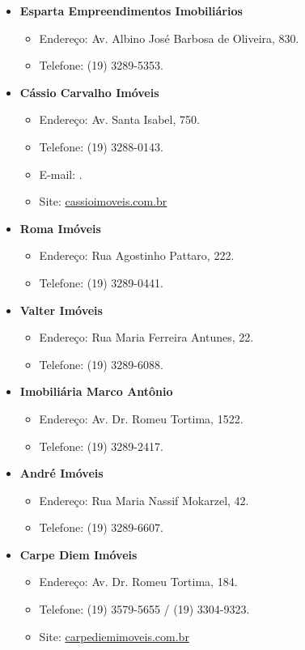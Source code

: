 \begin{itemize}
\item  \textbf{Esparta Empreendimentos Imobiliários}
\begin{itemize}
\item  Endereço: Av. Albino José Barbosa de Oliveira, 830.
\item  Telefone: (19) 3289-5353.
\end{itemize}

\item  \textbf{Cássio Carvalho Imóveis}
\begin{itemize}
\item  Endereço: Av. Santa Isabel, 750.
\item  Telefone: (19) 3288-0143.
\item  E-mail: .
\item  Site: \url{cassioimoveis.com.br}
\end{itemize}

\item  \textbf{Roma Imóveis}
\begin{itemize}
\item  Endereço: Rua Agostinho Pattaro, 222.
\item  Telefone: (19) 3289-0441.
\end{itemize}

\item  \textbf{Valter Imóveis}
\begin{itemize}
\item  Endereço: Rua Maria Ferreira Antunes, 22.
\item  Telefone: (19) 3289-6088.
\end{itemize}

\item  \textbf{Imobiliária Marco Antônio}
\begin{itemize}
\item  Endereço: Av. Dr. Romeu Tortima, 1522.
\item  Telefone: (19) 3289-2417.
\end{itemize}

\item  \textbf{André Imóveis}
\begin{itemize}
\item  Endereço: Rua Maria Nassif Mokarzel, 42.
\item  Telefone: (19) 3289-6607.
\end{itemize}

\item  \textbf{Carpe Diem Imóveis}
\begin{itemize}
\item  Endereço: Av. Dr. Romeu Tortima, 184.
\item  Telefone: (19) 3579-5655 / (19) 3304-9323.
\item  Site: \url{carpediemimoveis.com.br}
\end{itemize}
\end{itemize}
